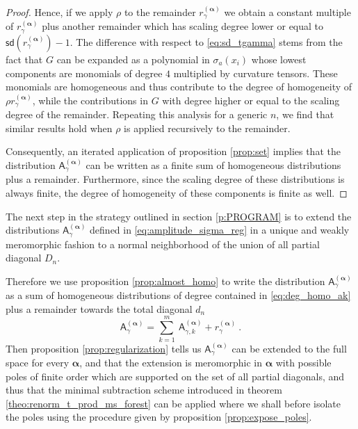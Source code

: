 \documentclass[11pt]{book}
\newcommand{\sd}{\mathsf{sd}}
\newcommand{\alphabd}{\boldsymbol{\alpha}}
\newcommand{\Asf}{\mathsf{A}}
\theoremstyle{break}
\begin{document}
\begin{proof}
%
Hence, if we apply $\rho$ to the remainder $r^{(\alphabd)}_\gamma$ we obtain a constant multiple of $r^{(\alphabd)}_\gamma$ plus another remainder which has scaling degree lower or equal to $\sd(r^{(\alphabd)}_\gamma)-1$. The difference with respect to \eqref{eq:sd_tgamma} stems from the fact that $G$ can be expanded as a polynomial in $\sigma_a(x_i)$ whose lowest components are monomials of degree $4$ multiplied by curvature tensors. These monomials are homogeneous and thus contribute to the degree of homogeneity of $\rho r^{(\alphabd)}_\gamma$, while the contributions in $G$ with degree higher or equal to the scaling degree of the remainder. Repeating this analysis for a generic $n$, we find that similar results hold when $\rho$ is applied recursively to the remainder.\par
%
Consequently, an iterated application of proposition \ref{prop:set} implies that the distribution $\Asf_\gamma^{(\alphabd)}$ can be written as a finite sum of homogeneous distributions plus a remainder. Furthermore, since the scaling degree of these distributions is always finite, the degree of homogeneity of these components is finite as well. 
\end{proof}


The next step in the strategy outlined in section \ref{p:PROGRAM} is to extend the distributions $\Asf^{(\alphabd)}_\gamma$ defined in \eqref{eq:amplitude_sigma_reg} in a unique and weakly meromorphic fashion to a normal neighborhood of the union of all partial diagonal $D_n$. 


Therefore we use proposition \ref{prop:almost_homo} to write the distribution $\Asf_\gamma^{(\alphabd)}$ as a sum of homogeneous distributions of degree contained in \eqref{eq:deg_homo_ak} plus a remainder towards the total diagonal $d_n$
%
\begin{equation*}
\Asf_\gamma^{(\alphabd)} = \sum_{k=1}^m \ \Asf_{\gamma,k}^{(\alphabd)} + r_\gamma^{(\alphabd)} \ .
\end{equation*}
%
Then proposition \ref{prop:regularization} tells us $\Asf_\gamma^{(\alphabd)}$ can be extended to the full space for every $\alphabd$, and that the extension is meromorphic in $\alphabd$ with possible poles of finite order which are supported on the set of all partial diagonals, and thus that the minimal subtraction scheme introduced in theorem \ref{theo:renorm_t_prod_ms_forest} can be applied where we shall before isolate the poles using the procedure given by proposition \ref{prop:expose_poles}. 
\end{document}
